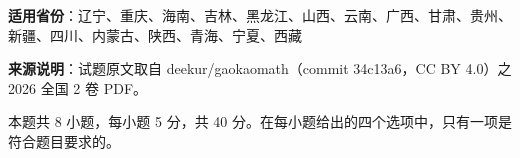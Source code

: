 

\begin{gknotice}
\textbf{适用省份}：辽宁、重庆、海南、吉林、黑龙江、山西、云南、广西、甘肃、贵州、新疆、四川、内蒙古、陕西、青海、宁夏、西藏

\textbf{来源说明}：试题原文取自 deekur/gaokaomath（commit 34c13a6，CC BY 4.0）之 2026 全国 2 卷 PDF。
\end{gknotice}

\par\medskip


\begin{gktip}
本题共 8 小题，每小题 5 分，共 40 分。在每小题给出的四个选项中，只有一项是符合题目要求的。
\end{gktip}

